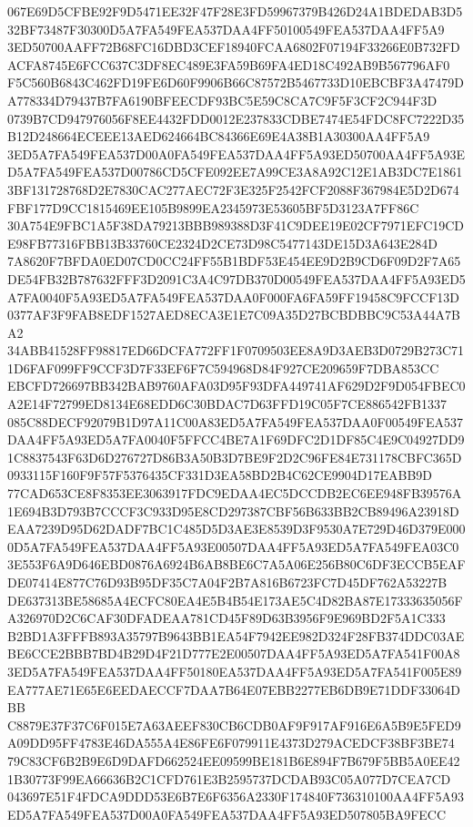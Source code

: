 \documentclass[UTF8,fontset=fandol,zihao=-4,a4paper]{ctexart}
\begin{document}
{{067E69D5CFBE92F9D5471EE32F47F28E3FD59967379B426D24A1BDEDAB3D532BF73487F30300D5A7FA549FEA537DAA4FF50100549FEA537DAA4FF5A9
3ED50700AAFF72B68FC16DBD3CEF18940FCAA6802F07194F33266E0B732FDACFA8745E6FCC637C3DF8EC489E3FA59B69FA4ED18C492AB9B567796AF0
F5C560B6843C462FD19FE6D60F9906B66C87572B5467733D10EBCBF3A47479DA778334D79437B7FA6190BFEECDF93BC5E59C8CA7C9F5F3CF2C944F3D
0739B7CD947976056F8EE4432FDD0012E237833CDBE7474E54FDC8FC7222D35B12D248664ECEEE13AED624664BC84366E69E4A38B1A30300AA4FF5A9
3ED5A7FA549FEA537D00A0FA549FEA537DAA4FF5A93ED50700AA4FF5A93ED5A7FA549FEA537D00786CD5CFE092EE7A99CE3A8A92C12E1AB3DC7E1861
3BF131728768D2E7830CAC277AEC72F3E325F2542FCF2088F367984E5D2D674FBF177D9CC1815469EE105B9899EA2345973E53605BF5D3123A7FF86C
30A754E9FBC1A5F38DA79213BBB989388D3F41C9DEE19E02CF7971EFC19CDE98FB77316FBB13B33760CE2324D2CE73D98C5477143DE15D3A643E284D
7A8620F7BFDA0ED07CD0CC24FF55B1BDF53E454EE9D2B9CD6F09D2F7A65DE54FB32B787632FFF3D2091C3A4C97DB370D00549FEA537DAA4FF5A93ED5
A7FA0040F5A93ED5A7FA549FEA537DAA0F000FA6FA59FF19458C9FCCF13D0377AF3F9FAB8EDF1527AED8ECA3E1E7C09A35D27BCBDBBC9C53A44A7BA2
34ABB41528FF98817ED66DCFA772FF1F0709503EE8A9D3AEB3D0729B273C711D6FAF099FF9CCF3D7F33EF6F7C594968D84F927CE209659F7DBA853CC
EBCFD726697BB342BAB9760AFA03D95F93DFA449741AF629D2F9D054FBEC0A2E14F72799ED8134E68EDD6C30BDAC7D63FFD19C05F7CE886542FB1337
085C88DECF92079B1D97A11C00A83ED5A7FA549FEA537DAA0F00549FEA537DAA4FF5A93ED5A7FA0040F5FFCC4BE7A1F69DFC2D1DF85C4E9C04927DD9
1C8837543F63D6D276727D86B3A50B3D7BE9F2D2C96FE84E731178CBFC365D0933115F160F9F57F5376435CF331D3EA58BD2B4C62CE9904D17EABB9D
77CAD653CE8F8353EE3063917FDC9EDAA4EC5DCCDB2EC6EE948FB39576A1E694B3D793B7CCCF3C933D95E8CD297387CBF56B633BB2CB89496A23918D
EAA7239D95D62DADF7BC1C485D5D3AE3E8539D3F9530A7E729D46D379E0000D5A7FA549FEA537DAA4FF5A93E00507DAA4FF5A93ED5A7FA549FEA03C0
3E553F6A9D646EBD0876A6924B6AB8BE6C7A5A06E256B80C6DF3ECCB5EAFDE07414E877C76D93B95DF35C7A04F2B7A816B6723FC7D45DF762A53227B
DE637313BE58685A4ECFC80EA4E5B4B54E173AE5C4D82BA87E17333635056FA326970D2C6CAF30DFADEAA781CD45F89D63B3956F9E969BD2F5A1C333
B2BD1A3FFFB893A35797B9643BB1EA54F7942EE982D324F28FB374DDC03AEBE6CCE2BBB7BD4B29D4F21D777E2E00507DAA4FF5A93ED5A7FA541F00A8
3ED5A7FA549FEA537DAA4FF50180EA537DAA4FF5A93ED5A7FA541F005E89EA777AE71E65E6EEDAECCF7DAA7B64E07EBB2277EB6DB9E71DDF33064DBB
C8879E37F37C6F015E7A63AEEF830CB6CDB0AF9F917AF916E6A5B9E5FED9A09DD95FF4783E46DA555A4E86FE6F079911E4373D279ACEDCF38BF3BE74
79C83CF6B2B9E6D9DAFD662524EE09599BE181B6E894F7B679F5BB5A0EE421B30773F99EA66636B2C1CFD761E3B2595737DCDAB93C05A077D7CEA7CD
043697E51F4FDCA9DDD53E6B7E6F6356A2330F174840F736310100AA4FF5A93ED5A7FA549FEA537D00A0FA549FEA537DAA4FF5A93ED507805BA9FECC
}}
\end{document}
